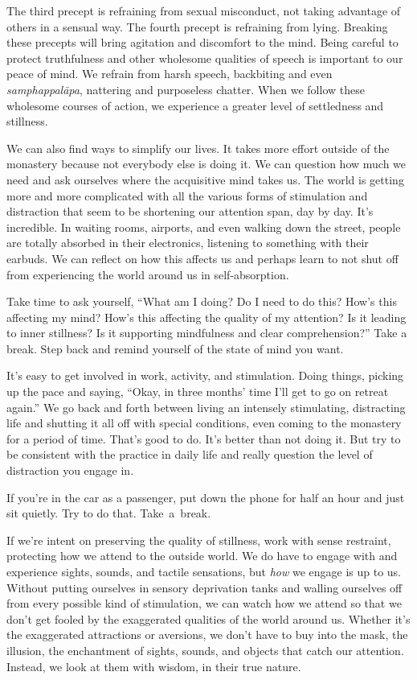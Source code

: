 The third precept is refraining from sexual misconduct, not taking advantage of others in a sensual way. The fourth precept is refraining from lying. Breaking these precepts will bring agitation and discomfort to the mind. Being careful to protect truthfulness and other wholesome qualities of speech is important to our peace of mind. We refrain from harsh speech, backbiting and even \emph{samphappalāpa}, nattering and purposeless chatter. When we follow these wholesome courses of action, we experience a greater level of settledness and stillness.

We can also find ways to simplify our lives. It takes more effort outside of the monastery because not everybody else is doing it. We can question how much we need and ask ourselves where the acquisitive mind takes us. The world is getting more and more complicated with all the various forms of stimulation and distraction that seem to be shortening our attention span, day by day. It's incredible. In waiting rooms, airports, and even walking down the street, people are totally absorbed in their electronics, listening to something with their earbuds. We can reflect on how this affects us and perhaps learn to not shut off from experiencing the world around us in self-absorption.

Take time to ask yourself, ``What am I doing? Do I need to do this? How's this affecting my mind? How's this affecting the quality of my attention? Is it leading to inner stillness? Is it supporting mindfulness and clear comprehension?'' Take a break. Step back and remind yourself of the state of mind you want.

It's easy to get involved in work, activity, and stimulation. Doing things, picking up the pace and saying, ``Okay, in three months' time I'll get to go on retreat again.'' We go back and forth between living an intensely stimulating, distracting life and shutting it all off with special conditions, even coming to the monastery for a period of time. That's good to do. It's better than not doing it. But try to be consistent with the practice in daily life and really question the level of distraction you engage in.

If you're in the car as a passenger, put down the phone for half an hour and just sit quietly. Try to do that. \mbox{Take a break.}

If we're intent on preserving the quality of stillness, work with sense restraint, protecting how we attend to the outside world. We do have to engage with and experience sights, sounds, and tactile sensations, but \emph{how} we engage is up to us. Without putting ourselves in sensory deprivation tanks and walling ourselves off from every possible kind of stimulation, we can watch how we attend so that we don't get fooled by the exaggerated qualities of the world around us. Whether it's the exaggerated attractions or aversions, we don't have to buy into the mask, the illusion, the enchantment of sights, sounds, and objects that catch our attention. Instead, we look at them with wisdom, in their true nature.

